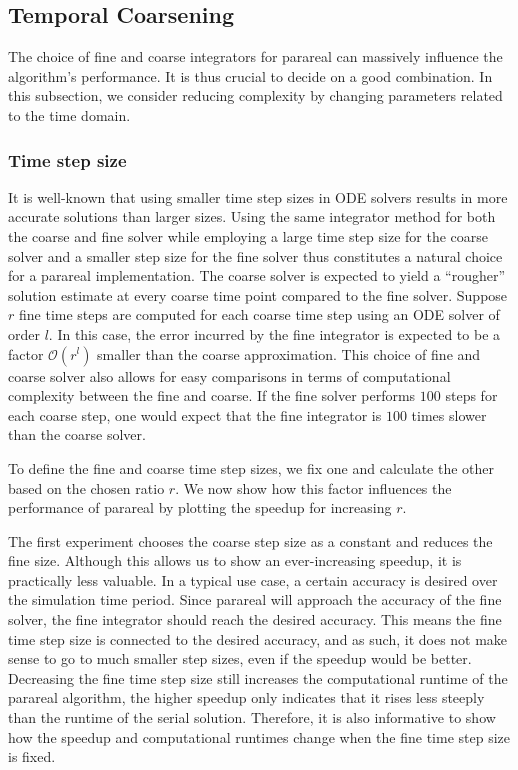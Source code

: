 \subsection{Temporal Coarsening}
\label{sec: temporal coarsening}
The choice of fine and coarse integrators for parareal can massively influence the algorithm's performance. It is thus crucial to decide on a good combination. In this subsection, we consider reducing complexity by changing parameters related to the time domain.
\subsubsection{Time step size}
\label{sub: step size}
 It is well-known that using smaller time step sizes in ODE solvers results in more accurate solutions than larger sizes. Using the same integrator method for both the coarse and fine solver while employing a large time step size for the coarse solver and a smaller step size for the fine solver thus constitutes a natural choice for a parareal implementation. The coarse solver is expected to yield a ``rougher'' solution estimate at every coarse time point compared to the fine solver. Suppose $r$ fine time steps are computed for each coarse time step using an ODE solver of order $l$. In this case, the error incurred by the fine integrator is expected to be a factor $\mathcal{O}(r^l)$ smaller than the coarse approximation. 
This choice of fine and coarse solver also allows for easy comparisons in terms of computational complexity between the fine and coarse. If the fine solver performs $100$ steps for each coarse step, one would expect that the fine integrator is $100$ times slower than the coarse solver.

To define the fine and coarse time step sizes, we fix one and calculate the other based on the chosen ratio $r$. We now show how this factor influences the performance of parareal by plotting the speedup for increasing $r$.

The first experiment chooses the coarse step size as a constant and reduces the fine size. Although this allows us to show an ever-increasing speedup, it is practically less valuable. In a typical use case, a certain accuracy is desired over the simulation time period. Since parareal will approach the accuracy of the fine solver, the fine integrator should reach the desired accuracy. This means the fine time step size is connected to the desired accuracy, and as such, it does not make sense to go to much smaller step sizes, even if the speedup would be better. Decreasing the fine time step size still increases the computational runtime of the parareal algorithm, the higher speedup only indicates that it rises less steeply than the runtime of the serial solution. Therefore, it is also informative to show how the speedup and computational runtimes change when the fine time step size is fixed.

